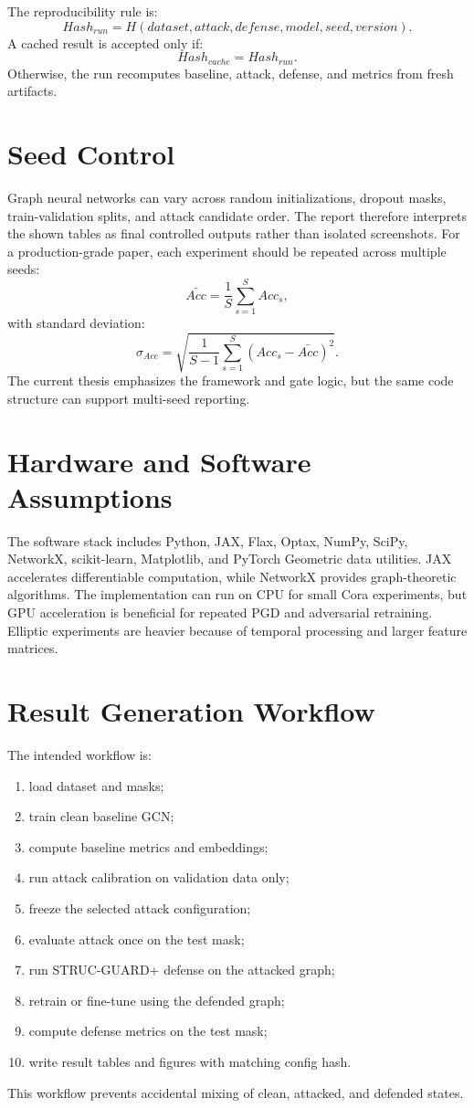 \documentclass[12pt,oneside]{report}
\begin{document}
The reproducibility rule is:
$$
Hash_{run}=H(dataset,attack,defense,model,seed,version).
$$
A cached result is accepted only if:
$$
Hash_{cache}=Hash_{run}.
$$
Otherwise, the run recomputes baseline, attack, defense, and metrics from fresh artifacts.

\section{Seed Control}
Graph neural networks can vary across random initializations, dropout masks, train-validation splits, and attack candidate order. The report therefore interprets the shown tables as final controlled outputs rather than isolated screenshots. For a production-grade paper, each experiment should be repeated across multiple seeds:
$$
\bar{Acc}=\frac{1}{S}\sum_{s=1}^{S}Acc_s,
$$
with standard deviation:
$$
\sigma_{Acc}=\sqrt{\frac{1}{S-1}\sum_{s=1}^{S}(Acc_s-\bar{Acc})^2}.
$$
The current thesis emphasizes the framework and gate logic, but the same code structure can support multi-seed reporting.

\section{Hardware and Software Assumptions}
The software stack includes Python, JAX, Flax, Optax, NumPy, SciPy, NetworkX, scikit-learn, Matplotlib, and PyTorch Geometric data utilities. JAX accelerates differentiable computation, while NetworkX provides graph-theoretic algorithms. The implementation can run on CPU for small Cora experiments, but GPU acceleration is beneficial for repeated PGD and adversarial retraining. Elliptic experiments are heavier because of temporal processing and larger feature matrices.

\section{Result Generation Workflow}
The intended workflow is:
\begin{enumerate}
    \item load dataset and masks;
    \item train clean baseline GCN;
    \item compute baseline metrics and embeddings;
    \item run attack calibration on validation data only;
    \item freeze the selected attack configuration;
    \item evaluate attack once on the test mask;
    \item run STRUC-GUARD+ defense on the attacked graph;
    \item retrain or fine-tune using the defended graph;
    \item compute defense metrics on the test mask;
    \item write result tables and figures with matching config hash.
\end{enumerate}
This workflow prevents accidental mixing of clean, attacked, and defended states.
\end{document}
